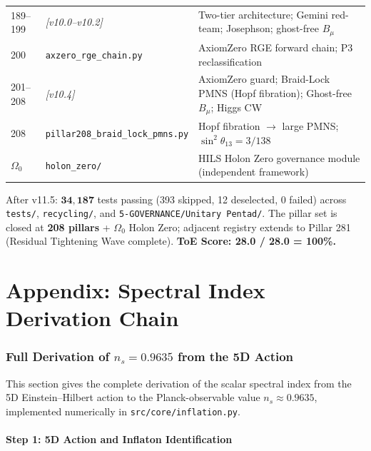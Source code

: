 \documentclass[12pt,a4paper]{article}
\begin{document}
\begin{center}
\begin{tabular}{lll}
189--199 & \emph{[v10.0--v10.2]} & Two-tier architecture; Gemini red-team; Josephson; ghost-free $B_\mu$ \\
200 & \texttt{axzero\_rge\_chain.py} & AxiomZero RGE forward chain; P3 reclassification \\
201--208 & \emph{[v10.4]} & AxiomZero guard; Braid-Lock PMNS (Hopf fibration); Ghost-free $B_\mu$; Higgs CW \\
208 & \texttt{pillar208\_braid\_lock\_pmns.py} & Hopf fibration $\to$ large PMNS; $\sin^2\theta_{13}=3/138$ \\
$\Omega_0$ & \texttt{holon\_zero/} & HILS Holon Zero governance module (independent framework) \\
\hline
\end{tabular}
\end{center}

\noindent
After v11.5: $\mathbf{34{,}187}$ tests passing (393 skipped, 12 deselected, 0 failed) across
\texttt{tests/}, \texttt{recycling/}, and \texttt{5-GOVERNANCE/Unitary Pentad/}.
The pillar set is closed at \textbf{208 pillars} + $\Omega_0$ Holon Zero;
adjacent registry extends to Pillar 281 (Residual Tightening Wave complete).
\textbf{ToE Score: 28.0 / 28.0 = 100\%.}

\part*{Appendix: Spectral Index Derivation Chain}

\section*{Full Derivation of $n_s = 0.9635$ from the 5D Action}
\label{sec:ns-derivation}

This section gives the complete derivation of the scalar spectral index
from the 5D Einstein--Hilbert action to the Planck-observable value
$n_s \approx 0.9635$, implemented numerically in \texttt{src/core/inflation.py}.

\subsection*{Step 1: 5D Action and Inflaton Identification}
\end{document}
